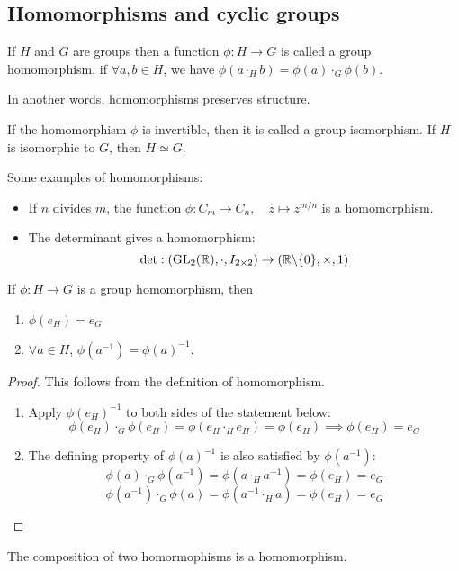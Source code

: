 \documentclass[a4paper]{article}
\begin{document}
\subsection{Homomorphisms and cyclic groups}
\begin{defi}[Homomorphism]
If $H$ and $G$ are groups then a function $\phi: H\rightarrow G$ is called a group homomorphism, if $\forall a,b\in H$, we have $\phi(a\cdot_H b)=\phi(a)\cdot_G\phi(b)$.
\end{defi}
In another words, homomorphisms preserves structure.
\begin{defi}[Isomorphism]
If the homomorphism $\phi$ is invertible, then it is called a group isomorphism. If $H$ is isomorphic to $G$, then $H\simeq G$.
\end{defi}
\begin{eg}
Some examples of homomorphisms:
\begin{itemize}
    \item If $n$ divides $m$, the function $\phi:C_m\rightarrow C_n,\quad z\mapsto z^{m/n}$ is a homomorphism.
    \item The determinant gives a homomorphism:
    $$\det:(\operatorname{GL}_2(\mathbb{R}),\cdot,I_{2\times 2})\rightarrow(\mathbb{R}\backslash\{0\},\times,1)$$
\end{itemize}
\end{eg}
\begin{lemma}
If $\phi: H\rightarrow G$ is a group homomorphism, then
\begin{enumerate}
    \item $\phi(e_H)=e_G$
    \item $\forall a\in H$, $\phi(a^{-1})=\phi(a)^{-1}$.
\end{enumerate}
\end{lemma}
\begin{proof}
This follows from the definition of homomorphism.
\begin{enumerate}
    \item Apply $\phi(e_H)^{-1}$ to both sides of the statement below:
    $$\phi(e_H)\cdot_G\phi(e_H)=\phi(e_H\cdot_He_H)=\phi(e_H)\implies\phi(e_H)=e_G$$
    \item The defining property of $\phi(a)^{-1}$ is also satisfied by $\phi(a^{-1})$: $$\phi(a)\cdot_G\phi(a^{-1})=\phi(a\cdot_Ha^{-1})=\phi(e_H)=e_G$$
    $$\phi(a^{-1})\cdot_G\phi(a)=\phi(a^{-1}\cdot_Ha)=\phi(e_H)=e_G$$
\end{enumerate}
\end{proof}
\begin{cor}
The composition of two homormophisms is a homomorphism.
\end{cor}
\end{document}
